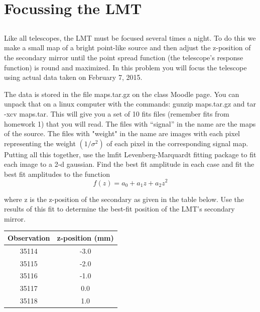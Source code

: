 \section{Focussing the LMT}

\subsection{}
Like all telescopes, the LMT must be focused
several times a night. To do this we make a small map of a bright point-like source and then
adjust the z-position of the secondary mirror until the point spread function (the telescope’s
response function) is round and maximized. In this problem you will focus the telescope using
actual data taken on February 7, 2015.

The data is stored in the file maps.tar.gz on the class Moodle page. You can unpack that on
a linux computer with the commands: gunzip maps.tar.gz and tar -xcv maps.tar. This will
give you a set of 10 fits files (remember fits from homework 1) that you will read. The files
with “signal” in the name are the maps of the source. The files with "weight" in the name are
images with each pixel representing the weight $(1/\sigma^2)$ of each pixel in the corresponding signal
map.
Putting all this together, use the lmfit Levenberg-Marquardt fitting package to fit each image
to a 2-d gaussian. Find the best fit amplitude in each case and fit the best fit amplitudes to
the function
\begin{equation}
    f(z)=a_0+a_1z+a_2z^2
\end{equation}

where z is the z-position of the secondary as given in the table below. 
Use the results of this
fit to determine the best-fit position of the LMT's secondary mirror.

\begin{table}[h]
    \centering
    \begin{tabular}{|c|c|}
        \toprule
         Observation  & z-position (mm)  \\
         \midrule
         35114 & -3.0\\
         35115 & -2.0 \\
         35116 & -1.0 \\
         35117 & 0.0 \\
         35118 & 1.0\\
         \bottomrule
    \end{tabular}
\end{table}

